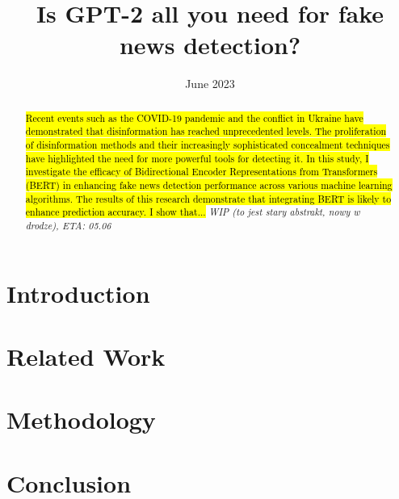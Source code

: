 \documentclass[magisterska,en]{mgr}
\title{Is GPT-2 all you need for fake news detection?}
\date{June 2023}
\begin{document}
\maketitle

\begin{abstract}
    \hl{Recent events such as the COVID-19 pandemic and the conflict in Ukraine have demonstrated that disinformation has reached unprecedented levels. The proliferation of disinformation methods and their increasingly sophisticated concealment techniques have highlighted the need for more powerful tools for detecting it. In this study, I investigate the efficacy of Bidirectional Encoder Representations from Transformers (BERT) in enhancing fake news detection performance across various machine learning algorithms. The results of this research demonstrate that integrating BERT is likely to enhance prediction accuracy. I show that...} \textit{WIP (to jest stary abstrakt, nowy w drodze), ETA: 05.06}
\end{abstract}

\tableofcontents

\chapter*{Introduction}


\chapter{Related Work}\label{r:related_work}


\chapter{Methodology}\label{r:methodology}


\chapter{Conclusion}\label{r:conclusion}


\appendix

\printbibliography[heading=bibintoc]
\end{document}
